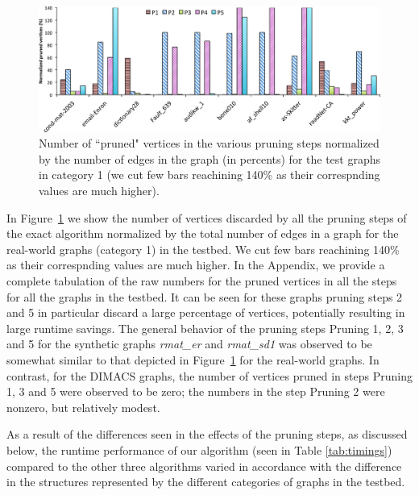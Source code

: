 \begin{figure}
  \centering
    \includegraphics[scale=0.4]{pruned.eps}
\caption{Number of ``pruned" vertices in the various pruning steps normalized
by the number of edges in the graph (in percents) for the test graphs in category 1 (we cut few bars reachining 140\% as their correspnding values are much higher).}
\label{fig-pruningplot}
\end{figure}


In Figure~\ref{fig-pruningplot} we show the number of vertices discarded by all
the  pruning steps of the exact algorithm normalized by the total number of edges
in a graph for the real-world graphs (category 1) in the testbed. We cut few bars reachining
140\% as their correspnding values are much higher.
In the Appendix, we provide a complete tabulation of the raw numbers for the pruned vertices in all the steps for all the graphs in the testbed. It can be seen for these graphs pruning steps 2 and 5 in particular discard a large percentage of vertices, potentially resulting in large runtime savings. The general behavior of the pruning steps Pruning 1, 2, 3 and 5 for the synthetic graphs {\em rmat\_er} and {\em rmat\_sd1} was observed to be somewhat similar to that depicted in Figure~\ref{fig-pruningplot} for the real-world graphs. In contrast, for the DIMACS graphs, the number of vertices pruned in steps Pruning 1, 3 and 5 were observed to be zero; the numbers in the step Pruning 2 were nonzero, but relatively modest.


As a result  of the differences seen in the effects of the pruning steps, as discussed below,
the runtime performance of our algorithm (seen in Table \ref{tab:timings}) compared
to the other three algorithms varied in accordance with the difference in the structures represented 
by the different categories of graphs in the testbed.

